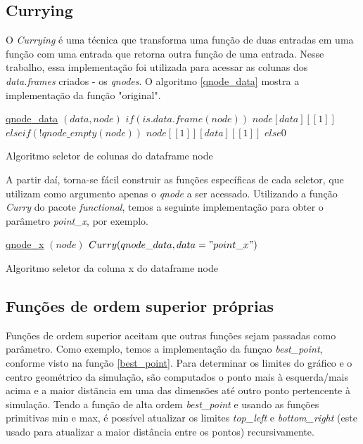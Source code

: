 \documentclass[rel_mlp]{iiufrgs}
\begin{document}
	\subsection{Currying}

    O \textit{Currying} é uma técnica que transforma uma função de duas entradas em uma função com uma entrada que retorna outra função de uma entrada. Nesse trabalho, essa implementação foi utilizada para acessar as colunas dos \textit{data.frames} criados - os \textit{qnodes}. O algoritmo \ref{qnode_data} mostra a implementação da função "original".
    \begin{algorithm}
	\label{qnode_data}
    \underline{qnode{\_}data} $(data, node)$\;
	$if(is.data.frame(node)) $\;
    $node[data][[1]] $\;
  	$else if(!qnode{\_}empty(node)) $\;
    $node[[1]][data][[1]] $\;
  	$else 0 $\;
	\caption{Algoritmo seletor de colunas do dataframe node}
	\end{algorithm}

    A partir daí, torna-se fácil construir as funções específicas de cada seletor, que utilizam como argumento apenas o \textit{qnode} a ser acessado. Utilizando a função \textit{Curry} do pacote \textit{functional}, temos a seguinte implementação para obter o parâmetro \textit{point{\_}x}, por exemplo.

    \begin{algorithm}
	\label{qnode_x}
    \underline{qnode{\_}x} $(node)$\;
	$Curry(qnode{\_}data, data="point{\_}x") $\;
	\caption{Algoritmo seletor da coluna x do dataframe node}
	\end{algorithm}

	\subsection{Funções de ordem superior próprias}

    Funções de ordem superior aceitam que outras funções sejam passadas como parâmetro. Como exemplo, temos a implementação da funçao
        \textit{best{\_}point}, conforme visto na função \ref{best_point}. Para determinar os limites do gráfico e o centro geométrico da simulação,
         são computados o ponto mais à esquerda/mais acima e a maior distãncia em uma das dimensões até outro ponto pertencente à simulação. Tendo a função de alta ordem \textit{best{\_}point} e usando as funções primitivas min e max, é possível atualizar os limites \textit{top{\_}left} e \textit{bottom{\_}right} (este usado para atualizar a maior distância entre os pontos) recursivamente.
\end{document}
